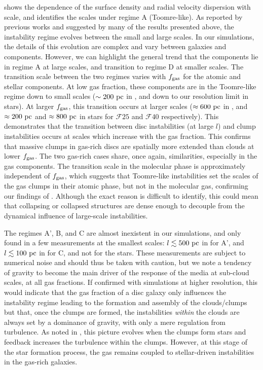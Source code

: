\documentclass[useAMS,usenatbib]{mnras}
\newcommand{\fgas}{\ensuremath{f_{\rm gas}}\xspace}
\newcommand{\gm}{\ensuremath{\mathcal{F}25}\xspace}
\newcommand{\gl}{\ensuremath{\mathcal{F}40}\xspace}
\begin{document}
 shows the dependence of the surface density and radial velocity dispersion with scale, and identifies the scales under regime A (Toomre-like). As reported by previous works \citep{Romeo2010, Romeo2014, Agertz2015b} and suggested by many of the results presented above, the instability regime evolves between the small and large scales. In our simulations, the details of this evolution are complex and vary between galaxies and components. However, we can highlight the general trend that the components lie in regime A at large scales, and transition to regime D at smaller scales. The transition scale between the two regimes varies with \fgas for the atomic and stellar components. At low gas fraction, these components are in the Toomre-like regime down to small scales ($\sim 200 \mathrm{~pc}$ in \hi, and down to our resolution limit in stars). At larger \fgas, this transition occurs at larger scales ($\approx 600 \mathrm{~pc}$ in \hi, and $\approx 200 \mathrm{~pc}$ and $\approx 800 \mathrm{~pc}$ in stars for \gm and \gl respectively). This demonstrates that the transition between disc instabilities (at large $l$) and clump instabilities occurs at scales which increase with the gas fraction. This confirms that massive clumps in gas-rich discs are spatially more extended than clouds at lower \fgas. The two gas-rich cases share, once again, similarities, especially in the gas components.  The transition scale in the molecular phase is approximately independent of \fgas, which suggests that Toomre-like instabilities set the scales of the gas clumps in their atomic phase, but not in the molecular gas, confirming our findings of . Although the exact reason is difficult to identify, this could mean that collapsing or collapsed structures are dense enough to decouple from the dynamical influence of large-scale instabilities.

The regimes A', B, and C are almost inexistent in our simulations, and only found in a few measurements at the smallest scales: $l \lesssim 500 \mathrm{~pc}$ in \htwo for A', and $l \lesssim 100 \mathrm{~pc}$ in \hi for C, and not for the stars. These measurements are subject to numerical noise and should thus be taken with caution, but we note a tendency of gravity to become the main driver of the response of the media at sub-cloud scales, at all gas fractions. If confirmed with simulations at higher resolution, this would indicate that the gas fraction of a disc galaxy only influences the instability regime leading to the formation and assembly of the clouds/clumps but that, once the clumps are formed, the instabilities \emph{within} the clouds are always set by a dominance of gravity, with only a mere regulation from turbulence. As noted in , this picture evolves when the clumps form stars and feedback increases the turbulence within the clumps. However, at this stage of the star formation process, the gas remains coupled to stellar-driven instabilities in the gas-rich galaxies.
\end{document}
